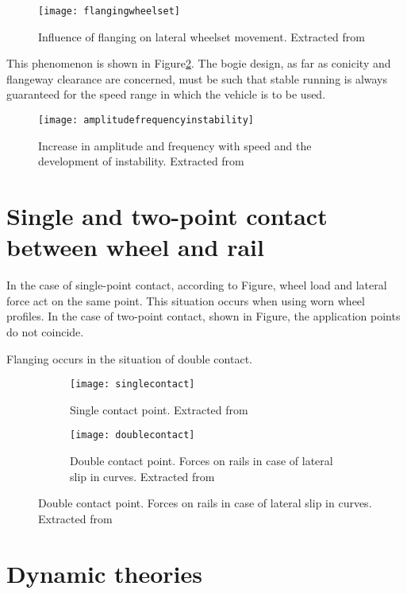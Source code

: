 \begin{figure}[h!]
	\centering
	\texttt{[image: flangingwheelset]}
	\caption{Influence of flanging on lateral wheelset movement. Extracted from \cite[Figure 2.5]{esveld2001modern}}
	\label{fig:flangingwheelset}
\end{figure}

This phenomenon is shown in Figure\ref{fig:amplitudefrequencystability}. The bogie design, as far as conicity and flangeway clearance are concerned, must be such that stable running is always guaranteed for the speed range in which the vehicle is to be used.


\begin{figure}[h!]
	\centering
	\texttt{[image: amplitudefrequencyinstability]}
	\caption{Increase in amplitude and frequency with speed and the development of instability. Extracted from \cite[Figure 2.6]{esveld2001modern}}
	\label{fig:amplitudefrequencystability}
\end{figure}

\section{Single and two-point contact between wheel and rail}
In the case of single-point contact, according to Figure, wheel load and lateral force act on the same point. This situation occurs when using worn wheel profiles. In the case of two-point contact, shown in Figure, the application points do not coincide.

Flanging occurs in the situation of double contact. 

\begin{figure}[h!]
\centering
	\begin{subfigure}[b]{0.2\textwidth}
    	\centering
    	\texttt{[image: singlecontact]}
    	\caption{Single contact point.  Extracted from \cite[Figure 2.13]{esveld2001modern}}
    	\label{fig:singlecontact}
	\end{subfigure}
	\begin{subfigure}[b]{0.5\textwidth}
    	\texttt{[image: doublecontact]}
    	\caption{Double contact point. Forces on rails in case of lateral slip in curves. Extracted from \cite[Figure 2.14]{esveld2001modern}}
    	\label{fig:doublecontract}
	\end{subfigure}
\end{figure}

\section{Dynamic theories}

